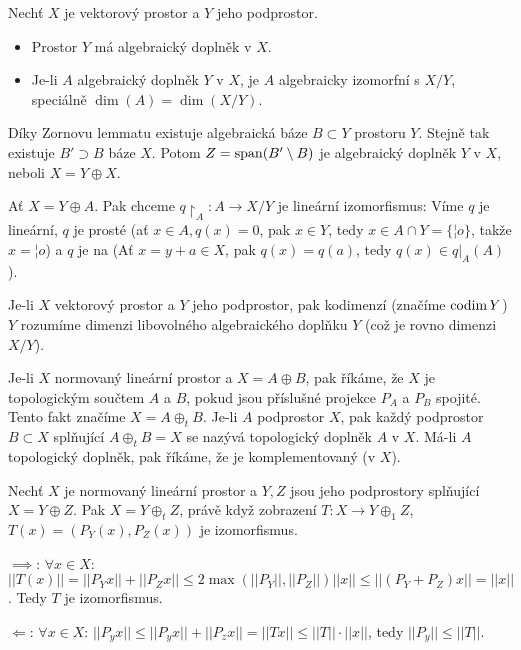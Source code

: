 \documentclass[12pt]{article}					%
\begin{document}
\begin{veta}
	Nechť $X$ je vektorový prostor a $Y$ jeho podprostor.

	\begin{itemize}
		\item Prostor $Y$ má algebraický doplněk v $X$.
		\item Je-li $A$ algebraický doplněk $Y$ v $X$, je $A$ algebraicky izomorfní s $X / Y$, speciálně $\dim(A) = \dim(X / Y)$.
	\end{itemize}

	\begin{dukazin}
		Díky Zornovu lemmatu existuje algebraická báze $B \subset Y$ prostoru $Y$. Stejně tak existuje $B' \supset B$ báze $X$. Potom $Z = \operatorname{span}(B' \setminus B)$ je algebraický doplněk $Y$ v $X$, neboli $X = Y \oplus X$.


		Ať $X = Y \oplus A$. Pak chceme $q\upharpoonright_A: A \rightarrow X / Y$ je lineární izomorfismus: Víme $q$ je lineární, $q$ je prosté (ať $x \in A, q(x) = 0$, pak $x \in Y$, tedy $x \in A \cap Y = \{¦o\}$, takže $x = ¦o$) a $q$ je na (Ať $x = y + a \in X$, pak $q(x) = q(a)$, tedy $q(x) \in q|_A(A)$). 
	\end{dukazin}
\end{veta}

\begin{definice}[Kodimenze]
	Je-li $X$ vektorový prostor a $Y$ jeho podprostor, pak kodimenzí (značíme $\operatorname{codim} Y$) $Y$ rozumíme dimenzi libovolného algebraického doplňku $Y$ (což je rovno dimenzi $X / Y$).
\end{definice}

\begin{definice}
	Je-li $X$ normovaný lineární prostor a $X = A \oplus B$, pak říkáme, že $X$ je topologickým součtem $A$ a $B$, pokud jsou příslušné projekce $P_A$ a $P_B$ spojité. Tento fakt značíme $X = A \oplus_t B$. Je-li $A$ podprostor $X$, pak každý podprostor $B \subset X$ splňující $A \oplus_t B = X$ se nazývá topologický doplněk $A$ v $X$. Má-li $A$ topologický doplněk, pak říkáme, že je komplementovaný (v $X$).
\end{definice}

\begin{veta}
	Nechť $X$ je normovaný lineární prostor a $Y, Z$ jsou jeho podprostory splňující $X = Y \oplus Z$. Pak $X = Y \oplus_t Z$, právě když zobrazení $T: X \rightarrow Y \oplus_1 Z$, $T(x) = (P_Y(x), P_Z(x))$ je izomorfismus.

	\begin{dukazin}
		$\implies$: $\forall x \in X$: $||T(x)|| = ||P_Y x|| + ||P_Z x|| ≤ 2\max (||P_Y||, ||P_Z||) ||x|| ≤ ||(P_Y + P_Z)x|| = ||x||$. Tedy $T$ je izomorfismus.

		$\Leftarrow$: $\forall x \in X$: $||P_yx|| ≤ ||P_yx|| + ||P_z x|| = ||T x|| ≤ ||T||·||x||$, tedy $||P_y|| ≤ ||T||$.
	\end{dukazin}
\end{veta}
\end{document}
